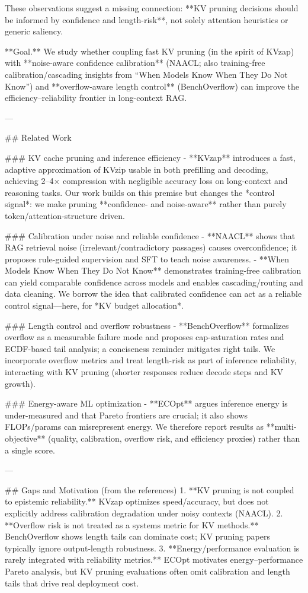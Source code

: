 These observations suggest a missing connection: **KV pruning decisions should be informed by confidence and length-risk**, not solely attention heuristics or generic saliency.

**Goal.** We study whether coupling fast KV pruning (in the spirit of KVzap) with **noise-aware confidence calibration** (NAACL; also training-free calibration/cascading insights from “When Models Know When They Do Not Know”) and **overflow-aware length control** (BenchOverflow) can improve the efficiency–reliability frontier in long-context RAG.

---

## Related Work  

### KV cache pruning and inference efficiency  
- **KVzap** introduces a fast, adaptive approximation of KVzip usable in both prefilling and decoding, achieving 2–4× compression with negligible accuracy loss on long-context and reasoning tasks. Our work builds on this premise but changes the *control signal*: we make pruning **confidence- and noise-aware** rather than purely token/attention-structure driven.

### Calibration under noise and reliable confidence  
- **NAACL** shows that RAG retrieval noise (irrelevant/contradictory passages) causes overconfidence; it proposes rule-guided supervision and SFT to teach noise awareness.  
- **When Models Know When They Do Not Know** demonstrates training-free calibration can yield comparable confidence across models and enables cascading/routing and data cleaning. We borrow the idea that calibrated confidence can act as a reliable control signal—here, for *KV budget allocation*.

### Length control and overflow robustness  
- **BenchOverflow** formalizes overflow as a measurable failure mode and proposes cap-saturation rates and ECDF-based tail analysis; a conciseness reminder mitigates right tails. We incorporate overflow metrics and treat length-risk as part of inference reliability, interacting with KV pruning (shorter responses reduce decode steps and KV growth).

### Energy-aware ML optimization  
- **ECOpt** argues inference energy is under-measured and that Pareto frontiers are crucial; it also shows FLOPs/params can misrepresent energy. We therefore report results as **multi-objective** (quality, calibration, overflow risk, and efficiency proxies) rather than a single score.

---

## Gaps and Motivation (from the references)  
1. **KV pruning is not coupled to epistemic reliability.** KVzap optimizes speed/accuracy, but does not explicitly address calibration degradation under noisy contexts (NAACL).  
2. **Overflow risk is not treated as a systems metric for KV methods.** BenchOverflow shows length tails can dominate cost; KV pruning papers typically ignore output-length robustness.  
3. **Energy/performance evaluation is rarely integrated with reliability metrics.** ECOpt motivates energy–performance Pareto analysis, but KV pruning evaluations often omit calibration and length tails that drive real deployment cost.

